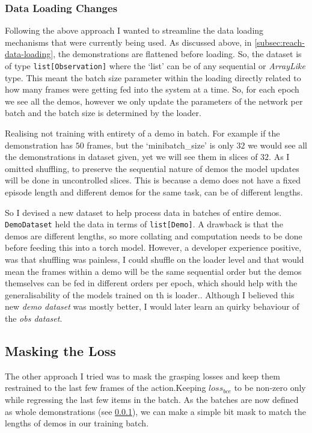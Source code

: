 \subsubsection{Data Loading Changes}\label{subsec:grasp-data-loading-changes}
Following the above approach I wanted to streamline the data loading mechanisms that were currently being used. As discussed above, in \ref{subsec:reach-data-loading}, the demonstrations are flattened before loading. So, the dataset is of type \verb|list[Observation]| where the `list' can be of any sequential or \emph{ArrayLike} type. This meant the batch size parameter within the loading directly related to how many frames were getting fed into the system at a time. So, for each epoch we see all the demos, however we only update the parameters of the network per batch and the batch size is determined by the loader.

Realising not training with entirety of a demo in batch. For example if the demonstration has $50$ frames, but the `minibatch\_size' is only $32$ we would see all the demonstrations in dataset given, yet we will see them in slices of $32$. As I omitted shuffling, to preserve the sequential nature of demos the model updates will be done in uncontrolled slices. This is because a demo does not have a fixed episode length and different demos for the same task, can be of different lengths.

So I devised a new dataset to help process data in batches of entire demos. \verb|DemoDataset| held the data in terms of \verb|list[Demo]|. A drawback is that the demos are different lengths, so more collating and computation needs to be done before feeding this into a torch model. However, a developer experience positive, was that shuffling was painless, I could shuffle on the loader level and that would mean the frames within a demo will be the same sequential order but the demos themselves can be fed in different orders per epoch, which should help with the generalisability of the models trained on th is loader.. Although I believed this new \emph{demo dataset} was mostly better, I would later learn an quirky behaviour of the \emph{obs dataset}.

\subsection{Masking the Loss}
The other approach I tried was to mask the grasping losses and keep them restrained to the last few frames of the action.Keeping $loss_{bce}$ to be non-zero only while regressing the last few items in the batch. As the batches are now defined as whole demonstrations (see \ref{subsec:grasp-data-loading-changes}), we can make a simple bit mask to match the lengths of demos in our training batch.

